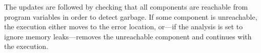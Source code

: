 \noindent
The updates are followed by checking that all components are reachable from
program variables in order to detect garbage.
If some component is unreachable, the execution either moves to the
error location, or---if the analysis is set to ignore memory leaks---removes the
unreachable component and continues with the execution.

%

%
%
%


%

%


